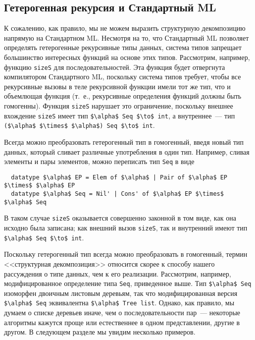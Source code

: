 \subsection{Гетерогенная рекурсия и Стандартный ML}
\label{sc:10.1.1}

К сожалению, как правило, мы не можем выразить структурную
декомпозицию напрямую на Стандартном ML. Несмотря на то, что
Стандартный ML позволяет определять гетерогенные рекурсивные типы
данных, система типов запрещает большинство интересных функций на
основе этих типов. Рассмотрим, например, функцию \lstinline!sizeS! для
последовательностей. Эта функция будет отвергнута компилятором
Стандартного ML, поскольку система типов требует, чтобы все
рекурсивные вызовы в теле рекурсивной функции имели тот же тип, что и
объемлющая функция (т.~е., рекурсивные определения функций должны быть
гомогенны). Функция \lstinline!sizeS! нарушает это ограничение,
поскольку внешнее вхождение \lstinline!sizeS! имеет тип 
\lstinline!$\alpha$ Seq $\to$ int!, а внутреннее~--- тип 
\lstinline!($\alpha$ $\times$ $\alpha$) Seq $\to$ int!.

Всегда можно преобразовать гетерогенный тип в гомогенный, введя новый
тип данных, который сливает различные употребления в один
тип. Например, сливая элементы и пары элементов, можно переписать тип
\lstinline!Seq! в виде
\begin{lstlisting}
  datatype $\alpha$ EP = Elem of $\alpha$ | Pair of $\alpha$ EP $\times$ $\alpha$ EP
  datatype $\alpha$ Seq = Nil' | Cons' of $\alpha$ EP $\times$ $\alpha$ Seq
\end{lstlisting}
В таком случае \lstinline!sizeS! оказывается совершенно законной в том
виде, как она исходно была записана; как внешний вызов
\lstinline!sizeS!, так и внутренний имеют тип 
\lstinline!$\alpha$ Seq $\to$ int!.

Поскольку гетерогенный тип всегда можно преобразовать в гомогенный,
термин <<структурная декомпозиция>> относится скорее к способу нашего
рассуждения о типе данных, чем к его реализации. Рассмотрим, например,
модифицированное определение типа \lstinline!Seq!, приведенное
выше. Тип \lstinline!$\alpha$ Seq! изоморфен двоичным листовым
деревьям, так что модифицированная версия \lstinline!$\alpha$ Seq!
эквивалентна \lstinline!$\alpha$ Tree list!. Однако, как правило, мы
думаем о списке деревьев иначе, чем о последовательности пар~---
некоторые алгоритмы кажутся проще или естественнее в одном
представлении, другие в другом. В следующем разделе мы увидим
несколько примеров.


